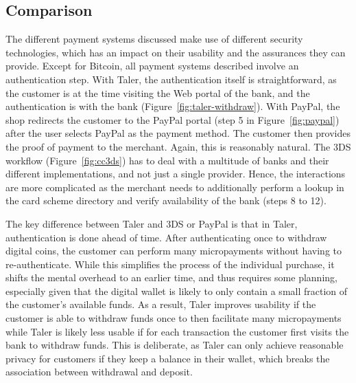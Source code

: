 \documentclass{llncs}
\begin{document}
\subsection{Comparison}

The different payment systems discussed make use of different security
technologies, which has an impact on their usability and the
assurances they can provide.  Except for Bitcoin, all payment systems
described involve an authentication step.
With Taler, the authentication itself is straightforward, as the customer is
at the time visiting the Web portal of the bank, and the authentication is
with the bank (Figure~\ref{fig:taler-withdraw}).  With PayPal, the
shop redirects the customer to the PayPal portal (step 5 in
Figure~\ref{fig:paypal}) after the user selects PayPal as the payment
method. The customer then provides the proof of payment to the
merchant.  Again, this is reasonably natural.  The 3DS workflow
(Figure~\ref{fig:cc3ds}) has to deal with a multitude of banks and
their different implementations, and not just a single provider.
Hence, the interactions are more complicated as the merchant needs to
additionally perform a lookup in the card scheme directory and verify
availability of the bank (steps 8 to 12).

The key difference between Taler and 3DS or PayPal is that
in Taler, authentication is done ahead of time.
After authenticating once to withdraw digital coins, the customer can
perform many micropayments without having to re-authenticate.  While
this simplifies the process of the individual purchase, it shifts the
mental overhead to an earlier time, and thus requires some planning,
especially given that the digital wallet is likely to only contain a
small fraction of the customer's available funds.  As a result, Taler
improves usability if the customer is able to withdraw funds once to
then facilitate many micropayments while Taler is likely less usable
if for each transaction the customer first visits the bank to withdraw
funds.  This is deliberate, as Taler can only achieve reasonable
privacy for customers if they keep a balance in their wallet,
which breaks the association between withdrawal and deposit.
\end{document}
